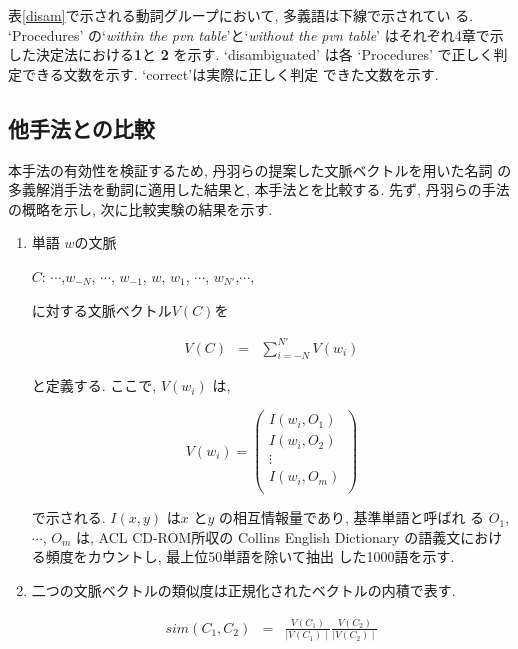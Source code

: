 \noindent
表\ref{disam}で示される動詞グループにおいて, 多義語は下線で示されてい
る.  `Procedures' の`{\it within the pvn table}'と`{\it without
the pvn table}' はそれぞれ4章で示した決定法における{\bf 1}と
{\bf 2} を示す.  `disambiguated' は各 
`Procedures' で正しく判定できる文数を示す.  `correct'は実際に正しく判定
できた文数を示す.

\subsection{他手法との比較}

本手法の有効性を検証するため, 丹羽らの提案した文脈ベクトルを用いた名詞
の多義解消手法を動詞に適用した結果と, 本手法とを比較する.  先ず, 
丹羽らの手法の概略を示し, 次に比較実験の結果を示す.


\begin{enumerate}

\item 単語 $w$の文脈

$C$: $\cdots$,$w_{-N}$, $\cdots$, $w_{-1}$, $w$, $w_{1}$, $\cdots$, $w_{N'}$,$\cdots$,

に対する文脈ベクトル$V(C)$を

\begin{eqnarray}
V(C) & = & \sum_{i=-N}^{N'} V(w_{i}) \nonumber 
\end{eqnarray}

と定義する. ここで, $V(w_{i})$ は,

\[ V(w_{i}) = \left( \begin{array}{c}
		   I(w_{i},O_{1}) \\
		   I(w_{i},O_{2}) \\
		   \vdots \\
		   I(w_{i},O_{m}) \\
		   \end{array} \right) \]

で示される.  $I(x,y)$ は$x$ と$y$ の相互情報量であり, 基準単語と呼ばれ
る $O_{1}$, $\cdots$, $O_{m}$ は, ACL CD-ROM所収の Collins English
Dictionary の語義文における頻度をカウントし, 最上位50単語を除いて抽出
した1000語を示す.


\item 二つの文脈ベクトルの類似度は正規化されたベクトルの内積で表す.

\begin{eqnarray}
sim(C_{1},C_{2}) & = & \frac{V(C_{1})}{\mid V(C_{1}) \mid} \frac{V(C_{2})}{\mid V(C_{2}) \mid}  \label{niwa1}
\end{eqnarray}


\end{enumerate}
